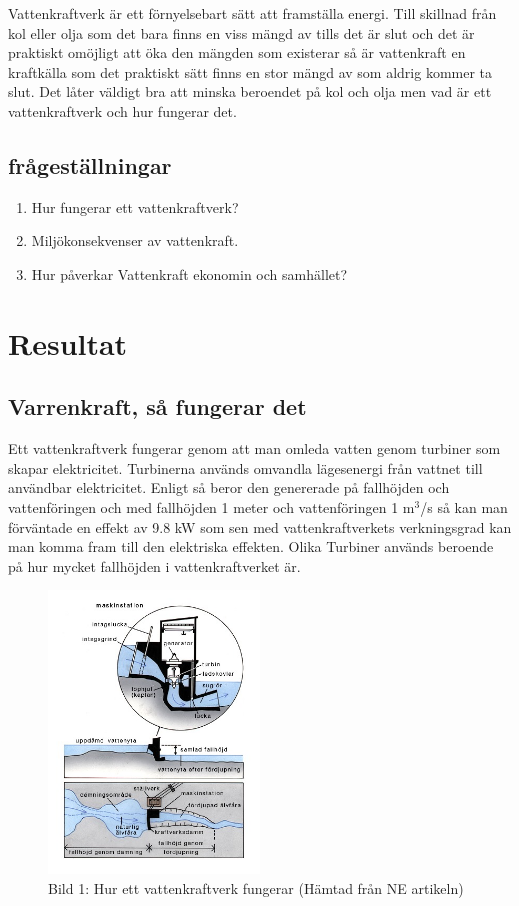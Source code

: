 \documentclass[11p]{article}
\begin{document}
Vattenkraftverk är ett förnyelsebart sätt att framställa energi.
 Till skillnad från kol eller olja som det bara finns en viss mängd av tills det är slut och det är praktiskt omöjligt att öka den mängden som existerar så är vattenkraft en kraftkälla som det praktiskt sätt finns en stor mängd av som aldrig kommer ta slut.
Det låter väldigt bra att minska beroendet på kol och olja men vad är ett vattenkraftverk och hur fungerar det.

 \subsection{frågeställningar}
 \begin{enumerate}
  \item Hur fungerar ett vattenkraftverk?
  \item Miljökonsekvenser av vattenkraft.
  \item Hur påverkar Vattenkraft ekonomin och samhället?
 \end{enumerate}
\clearpage
 \section{Resultat}

 \subsection{Varrenkraft, så fungerar det}

 Ett vattenkraftverk fungerar genom att man omleda vatten genom turbiner som skapar elektricitet.
 Turbinerna används omvandla lägesenergi från vattnet till användbar elektricitet.
 Enligt \textcite{NE} så beror den genererade på fallhöjden och vattenföringen och med fallhöjden 1 meter och vattenföringen 1 m${^3}$/s så kan man förväntade en effekt av 9.8 kW som sen med vattenkraftverkets verkningsgrad kan man komma fram till den elektriska effekten.
Olika Turbiner används beroende på hur mycket fallhöjden i vattenkraftverket är.

 \begin{figure}[!h]
  \centering
  \includegraphics[width=0.5\textwidth]{vattenkraft.jpg}
  \caption{Bild 1: Hur ett vattenkraftverk fungerar (Hämtad från NE artikeln)}
  \label{fig:vattenkraft}
 \end{figure}
\end{document}
